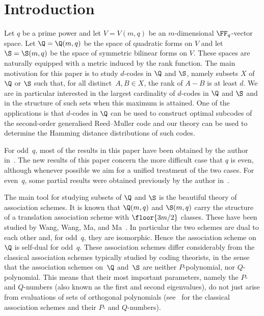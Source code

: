 \section{Introduction}

Let $q$ be a prime power and let $V=V(m,q)$ be an $m$-dimensional $\FF_q$-vector space. Let $\Q=\Q(m,q)$ be the space of quadratic forms on $V$ and let $\S=\S(m,q)$ be the space of symmetric bilinear forms on $V$. These spaces are naturally equipped with a metric induced by the rank function. The main motivation for this paper is to study $d$-codes in $\Q$ and $\S$, namely subsets $X$ of $\Q$ or $\S$ such that, for all distinct~$A,B\in X$, the rank of $A-B$ is at least $d$. We are in particular interested in the largest cardinality of $d$-codes in $\Q$ and $\S$ and in the structure of such sets when this maximum is attained. One of the applications is that $d$-codes in $\Q$ can be used to construct optimal subcodes of the second-order generalised Reed--Muller code and our theory can be used to determine the Hamming distance distributions of such codes.
\par
For odd~$q$, most of the results in this paper have been obtained by the author in~\cite{Sch2015}. The new results of this paper concern the more difficult case that $q$ is even, although whenever possible we aim for a unified treatment of the two cases.  For even~$q$, some partial results were obtained previously by the author in~\cite{Sch2010}.
\par
The main tool for studying subsets of $\Q$ and $\S$ is the beautiful theory of association schemes. It is known that $\Q(m,q)$ and $\S(m,q)$ carry the structure of a translation association scheme with $\floor{3m/2}$ classes. These have been studied by Wang, Wang, Ma, and Ma~\cite{WanWanMaMa2003}. In particular the two schemes are dual to each other and, for odd~$q$, they are isomorphic. Hence the association scheme on $\Q$ is self-dual for odd~$q$. These association schemes differ considerably from the classical association schemes typically studied by coding theorists, in the sense that the association schemes on~$\Q$ and~$\S$ are neither $P$-polynomial, nor $Q$-polynomial. This means that their most important parameters, namely the $P$- and $Q$-numbers (also known as the first and second eigenvalues), do not just arise from evaluations of sets of orthogonal polynomials (see~\cite{Del1976,Sta1980,Sta1981} for the classical association schemes and their $P$- and $Q$-numbers).
\par
